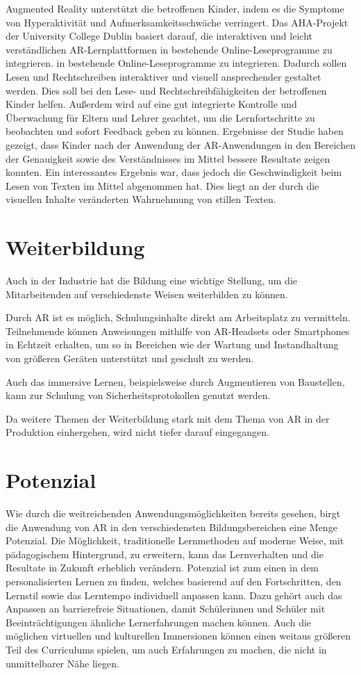 \documentclass[conference]{IEEEtran}
\begin{document}
Augmented Reality unterstützt die betroffenen Kinder, indem es die Symptome von Hyperaktivität und Aufmerksamkeitsschwäche verringert. Das AHA-Projekt der University College Dublin basiert darauf, die interaktiven und leicht verständlichen AR-Lernplattformen in bestehende Online-Leseprogramme zu integrieren. 
in bestehende Online-Leseprogramme zu integrieren. \cite{w5} Dadurch sollen Lesen und Rechtschreiben interaktiver und visuell ansprechender gestaltet werden. Dies soll bei den Lese- und Rechtschreibfähigkeiten der betroffenen Kinder helfen. Außerdem wird auf eine gut integrierte Kontrolle und Überwachung für Eltern und Lehrer geachtet, um die Lernfortschritte zu beobachten und sofort Feedback geben zu können. 
Ergebnisse der Studie haben gezeigt, dass Kinder nach der Anwendung der AR-Anwendungen in den Bereichen der Genauigkeit sowie des Verständnisses im Mittel bessere Resultate zeigen konnten. Ein interessantes Ergebnis war, dass jedoch die Geschwindigkeit beim Lesen von Texten im Mittel abgenommen hat. 
Dies liegt an der durch die visuellen Inhalte veränderten Wahrnehmung von stillen Texten. \cite{b16}

\section{Weiterbildung}
Auch in der Industrie hat die Bildung eine wichtige Stellung, um die Mitarbeitenden auf verschiedenste Weisen weiterbilden zu können.

Durch AR ist es möglich, Schulungsinhalte direkt am Arbeitsplatz zu vermitteln. Teilnehmende können Anweisungen mithilfe von AR-Headsets oder Smartphones in Echtzeit erhalten,
um so in Bereichen wie der Wartung und Instandhaltung von größeren Geräten unterstützt und geschult zu werden.

Auch das immersive Lernen, beispielsweise durch Augmentieren von Baustellen, kann zur Schulung von Sicherheitsprotokollen genutzt werden. \cite{b14}

Da weitere Themen der Weiterbildung stark mit dem Thema von AR in der Produktion einhergehen, wird nicht tiefer darauf eingegangen.

\section{Potenzial}
Wie durch die weitreichenden Anwendungsmöglichkeiten bereits gesehen, birgt die Anwendung von AR in den verschiedensten Bildungsbereichen eine Menge Potenzial.
Die Möglichkeit, traditionelle Lernmethoden auf moderne Weise, mit pädagogischem Hintergrund, zu erweitern, kann das Lernverhalten und die Resultate in Zukunft erheblich verändern. Potenzial ist zum einen in dem personalisierten Lernen zu finden, welches basierend auf den Fortschritten, den Lernstil sowie das Lerntempo individuell anpassen kann. Dazu gehört auch das Anpassen an barrierefreie Situationen, damit Schülerinnen und Schüler mit Beeinträchtigungen ähnliche Lernerfahrungen machen können. \cite{b13}
Auch die möglichen virtuellen und kulturellen Immersionen können einen weitaus größeren Teil des Curriculums spielen, um auch Erfahrungen zu machen, die nicht in unmittelbarer Nähe liegen.
\end{document}
